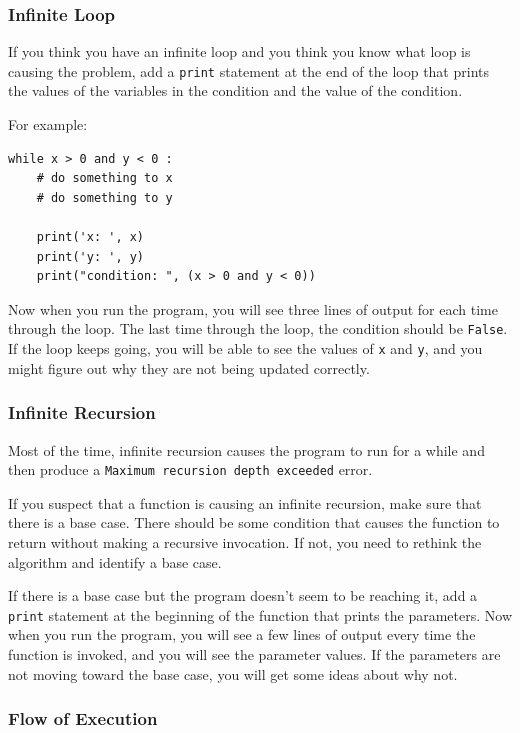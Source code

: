 \documentclass[10pt]{book}
\begin{document}
\subsubsection{Infinite Loop}

If you think you have an infinite loop and you think you know
what loop is causing the problem, add a {\tt print} statement at
the end of the loop that prints the values of the variables in
the condition and the value of the condition.

For example:

\begin{verbatim}
while x > 0 and y < 0 :
    # do something to x
    # do something to y

    print('x: ', x)
    print('y: ', y)
    print("condition: ", (x > 0 and y < 0))
\end{verbatim}
%
Now when you run the program, you will see three lines of output
for each time through the loop.  The last time through the
loop, the condition should be {\tt False}.  If the loop keeps
going, you will be able to see the values of {\tt x} and {\tt y},
and you might figure out why they are not being updated correctly.


\subsubsection{Infinite Recursion}

Most of the time, infinite recursion causes the program to run
for a while and then produce a {\tt Maximum recursion depth exceeded}
error.

If you suspect that a function is causing an infinite
recursion, make sure that there is a base case.
There should be some condition that causes the
function to return without making a recursive invocation.
If not, you need to rethink the algorithm and identify a base
case.

If there is a base case but the program doesn't seem to be reaching
it, add a {\tt print} statement at the beginning of the function
that prints the parameters.  Now when you run the program, you will see
a few lines of output every time the function is invoked,
and you will see the parameter values.  If the parameters are not moving
toward the base case, you will get some ideas about why not.


\subsubsection{Flow of Execution}
\end{document}
